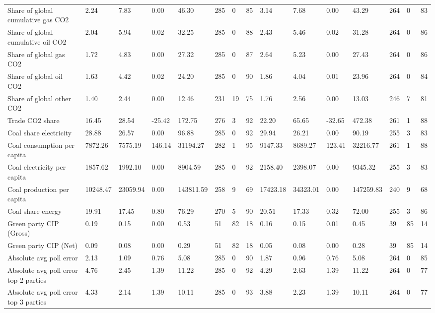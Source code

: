 \begin{longtable}{lllllllllllllll}
Share of global cumulative gas CO2 & 2.24 & 7.83 & 0.00 & 46.30 & 285 & 0 & 85 & 3.14 & 7.68 & 0.00 & 43.29 & 264 & 0 & 83\\
\addlinespace
Share of global cumulative oil CO2 & 2.04 & 5.94 & 0.02 & 32.25 & 285 & 0 & 88 & 2.43 & 5.46 & 0.02 & 31.28 & 264 & 0 & 86\\
Share of global gas CO2 & 1.72 & 4.83 & 0.00 & 27.32 & 285 & 0 & 87 & 2.64 & 5.23 & 0.00 & 27.43 & 264 & 0 & 86\\
Share of global oil CO2 & 1.63 & 4.42 & 0.02 & 24.20 & 285 & 0 & 90 & 1.86 & 4.04 & 0.01 & 23.96 & 264 & 0 & 84\\
Share of global other CO2 & 1.40 & 2.44 & 0.00 & 12.46 & 231 & 19 & 75 & 1.76 & 2.56 & 0.00 & 13.03 & 246 & 7 & 81\\
Trade CO2 share & 16.45 & 28.54 & -25.42 & 172.75 & 276 & 3 & 92 & 22.20 & 65.65 & -32.65 & 472.38 & 261 & 1 & 88\\
\addlinespace
Coal share electricity & 28.88 & 26.57 & 0.00 & 96.88 & 285 & 0 & 92 & 29.94 & 26.21 & 0.00 & 90.19 & 255 & 3 & 83\\
Coal consumption per capita & 7872.26 & 7575.19 & 146.14 & 31194.27 & 282 & 1 & 95 & 9147.33 & 8689.27 & 123.41 & 32216.77 & 261 & 1 & 88\\
Coal electricity per capita & 1857.62 & 1992.10 & 0.00 & 8904.59 & 285 & 0 & 92 & 2158.40 & 2398.07 & 0.00 & 9345.32 & 255 & 3 & 83\\
Coal production per capita & 10248.47 & 23059.94 & 0.00 & 143811.59 & 258 & 9 & 69 & 17423.18 & 34323.01 & 0.00 & 147259.83 & 240 & 9 & 68\\
Coal share energy & 19.91 & 17.45 & 0.80 & 76.29 & 270 & 5 & 90 & 20.51 & 17.33 & 0.32 & 72.00 & 255 & 3 & 86\\
\addlinespace
Green party CIP (Gross) & 0.19 & 0.15 & 0.00 & 0.53 & 51 & 82 & 18 & 0.16 & 0.15 & 0.01 & 0.45 & 39 & 85 & 14\\
Green party CIP (Net) & 0.09 & 0.08 & 0.00 & 0.29 & 51 & 82 & 18 & 0.05 & 0.08 & 0.00 & 0.28 & 39 & 85 & 14\\
Absolute avg poll error & 2.13 & 1.09 & 0.76 & 5.08 & 285 & 0 & 90 & 1.87 & 0.96 & 0.76 & 5.08 & 264 & 0 & 85\\
Absolute avg poll error top 2 parties & 4.76 & 2.45 & 1.39 & 11.22 & 285 & 0 & 92 & 4.29 & 2.63 & 1.39 & 11.22 & 264 & 0 & 77\\
Absolute avg poll error top 3 parties & 4.33 & 2.14 & 1.39 & 10.11 & 285 & 0 & 93 & 3.88 & 2.23 & 1.39 & 10.11 & 264 & 0 & 77\\

\end{longtable}
